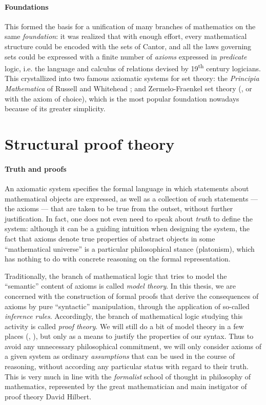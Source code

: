 \paragraph{Foundations}

This formed the basis for a unification of many branches of mathematics on the
same \emph{foundation}: it was realized that with enough effort, every
mathematical structure could be encoded with the sets of Cantor, and all the
laws governing sets could be expressed with a finite number of \emph{axioms}
expressed in \emph{predicate} logic, i.e. the language and calculus of relations
devised by 19\textsuperscript{th} century logicians. This crystallized into two
famous axiomatic systems for set theory: the \textit{Principia Mathematica} of
Russell and Whitehead ; and Zermelo-Fraenkel set theory
(, or  with the axiom of choice), which is the most popular
foundation nowadays because of its greater simplicity.

\section{Structural proof theory}

\paragraph{Truth and proofs}

An axiomatic system specifies the formal language in which statements about
mathematical objects are expressed, as well as a collection of such statements
--- the axioms --- that are taken to be true from the outset, without further
justification. In fact, one does not even need to speak about \emph{truth} to
define the system: although it can be a guiding intuition when designing the
system, the fact that axioms denote true properties of abstract objects in some
``mathematical universe'' is a particular philosophical stance (platonism),
which has nothing to do with concrete reasoning on the formal representation.

Traditionally, the branch of mathematical logic that tries to model the
``semantic'' content of axioms is called \emph{model theory}. In this thesis, we
are concerned with the construction of formal proofs that derive the
consequences of axioms by pure ``syntactic'' manipulation, through the
application of so-called \emph{inference rules}. Accordingly, the branch of
mathematical logic studying this activity is called \emph{proof theory}. We will
still do a bit of model theory in a few places (,
), but only as a means to justify the properties of our
syntax. Thus to avoid any unnecessary philosophical commitment, we will only
consider axioms of a given system as ordinary \emph{assumptions} that can be
used in the course of reasoning, without according any particular status with
regard to their truth. This is very much in line with the \emph{formalist}
school of thought in philosophy of mathematics, represented by the great
mathematician and main instigator of proof theory David Hilbert.

